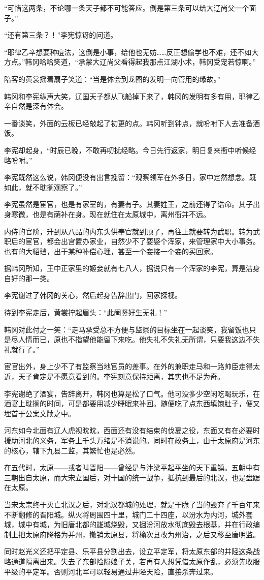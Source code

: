“可惜这两条，不论哪一条天子都不可能答应。倒是第三条可以给大辽尚父一个面子。”

“还有第三条？！”李宪惊讶的问道。

“耶律乙辛想要种痘法，这倒是小事，给他也无妨……反正想偷学也不难，还不如大方点。”韩冈哈哈笑道，“承蒙大辽尚父看得起我那点江湖小术，韩冈受宠若惊啊。”

陪客的黄裳摇着扇子笑道：“当是体会到龙图的发明一向管用的缘故。”

韩冈和李宪纵声大笑，辽国天子都从飞船掉下来了，韩冈的发明有多有用，耶律乙辛自然是深有体会。

一番谈笑，外面的云板已经敲起了初更的点。韩冈听到钟点，就吩咐下人去准备酒饭。

李宪却起身，“时辰已晚，不敢再叨扰经略。今日先行返家，明日复来衙中听候经略吩咐。”

李宪既然这么说，韩冈便没有出言挽留：“观察领军在外多日，家中定然想念。既如此，就不耽搁观察了。”

李宪虽然是宦官，也是有家室的，有妻有子。其妻姓王，之前还得了诰命。其子出身寒微，也是有荫补在身。现在就住在太原城中，离州衙并不远。

内侍的官阶，升到从八品的内东头供奉官就到顶了，再往上就要转为武职。转为武职后的宦官，都会出宫置办家业，自然少不了要娶个浑家，来管理家中大小事务。也有的大貂珰，出于某种补偿心理，甚至一个妾接一个妾的买回家。

据韩冈所知，王中正家里的姬妾就有七八人，据说只有一个浑家的李宪，算是洁身自好的那一类。

李宪谢过了韩冈的关心，然后起身告辞出门，回家探视。

待到李宪走后，黄裳拧起眉头：“此阉竖好生无礼！”

韩冈对此付之一笑：“走马承受总不方便与监察的目标坐在一起谈笑，我留饭也只是尽人情而已，原也不指望他能留下来吃。他失礼不失礼无所谓，只要我这边不失礼就行了。”

宦官出外，身上少不了有监察当地官员的差事。在外的兼职走马和一路帅臣走得太近，天子肯定是不愿意看到的。李宪刻意保持距离，其实也不足为奇。

李宪谢绝了酒宴，告辞离开，韩冈也算是松了口气。他可没多少空闲吃喝玩乐，在酒宴上耽搁的时间，可是都要用减少睡眠来补回。随便吃了点东西填饱肚子，便又埋首于公案文牍之中。

河东如今北面有辽人虎视眈眈，西面还有没有结束的伐夏之役，东面又有在必要时援助河北的义务，军务上千头万绪是不消说的。同时在政务上，由于太原府是河东的核心，辖下九县二监，其繁忙也是必然。

在五代时，太原——或者叫晋阳——曾经是与汴梁平起平坐的天下重镇。五朝中有三朝出自太原，而大宋立国后，对十国的统一战争，抵抗到最后的北汉，也是盘踞在太原。

当宋太宗终于灭亡北汉之后，对北汉都城的处理，就是干脆了当的毁弃了千百年来不断翻修的晋阳城。纵火将周围四十里，城门二十四座，以汾水为内河，城外套城，城中有城，为旧唐北都的雄城烧毁，又掘汾河放水彻底毁去根基，并在行政编制上把太原府降格为并州，撤销太原县，将榆次县改为州治，之后又移至唐明监。

同时赵光义还把平定县、乐平县分割出去，设立平定军，将太原东部的井陉这条战略通道隔离出来。失去了东部险隘娘子关，若再有人想凭借太原作乱，必须先收服平级的平定军。否则河北军可以轻易通过井陉天险，直接杀奔过来。

